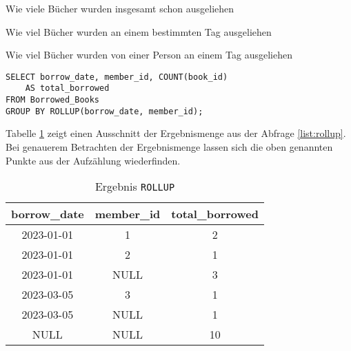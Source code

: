 \begin{description}
	\label{bul:aufzählung}

	\item[$\bullet$ 1. Punkt] Wie viele Bücher wurden insgesamt schon ausgeliehen

	\item[$\bullet$ 2. Punkt] Wie viel Bücher wurden an einem bestimmten Tag ausgeliehen

	\item[$\bullet$ 2. Punkt] Wie viel Bücher wurden von einer Person an einem Tag
		ausgeliehen
\end{description}

\begin{lstlisting}[caption={Beispiel eines ROLLUP}, label={list:rollup}]
SELECT borrow_date, member_id, COUNT(book_id)
	AS total_borrowed
FROM Borrowed_Books
GROUP BY ROLLUP(borrow_date, member_id);
\end{lstlisting}

Tabelle \ref{tab:rollup} zeigt einen Ausschnitt der Ergebnismenge aus der Abfrage \ref{list:rollup}.
Bei genauerem Betrachten der Ergebnismenge lassen sich die oben genannten Punkte
aus der Aufzählung wiederfinden.

\begin{table}[h]
	\centering
	\begin{tabular}{|c|c|c|}
		\hline
		\textbf{borrow\_date} & \textbf{member\_id} & \textbf{total\_borrowed} \\
		\hline
		2023-01-01            & 1                   & 2                        \\ %
		\hline
		2023-01-01            & 2                   & 1                        \\ %
		\hline
		2023-01-01            & NULL                & 3                        \\ %
		\hline
		2023-03-05            & 3                   & 1                        \\
		\hline
		2023-03-05            & NULL                & 1                        \\
		\hline
		NULL                  & NULL                & 10                       \\
		\hline
	\end{tabular}
	\caption{Ergebnis \texttt{ROLLUP}}
	\label{tab:rollup}
\end{table}

